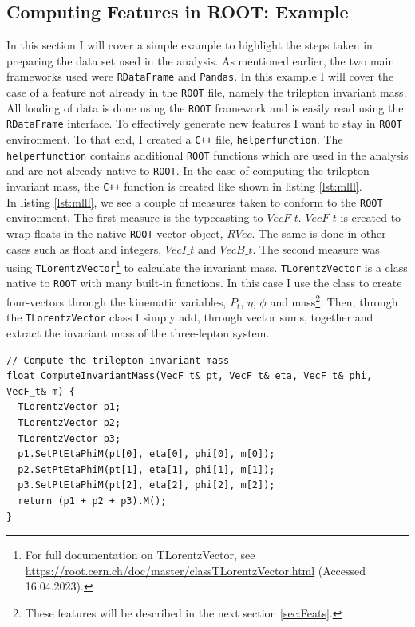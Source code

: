 \subsection{Computing Features in ROOT: Example}
In this section I will cover a simple example to highlight the steps taken in preparing the data set 
used in the analysis. As mentioned earlier, the two main frameworks used were \verb!RDataFrame! and \verb!Pandas!. 
In this example I will cover the case of a feature not already in the \verb!ROOT! file, namely the trilepton
invariant mass. All loading of data is done using the \verb!ROOT! framework and is easily read using the
\verb!RDataFrame! interface. To effectively generate new features I want to stay in \verb!ROOT! environment. To that end,
I created a \verb!C++! file, \texttt{helperfunction}. The \texttt{helperfunction} contains additional 
\verb!ROOT! functions which are used in the analysis and are not already native to \verb!ROOT!. In the case 
of computing the trilepton invariant mass, the \verb!C++! function is created like shown in listing 
\ref{lst:mlll}.
\\
In listing \ref{lst:mlll}, we see a couple of measures taken to conform to the \verb!ROOT! environment. The first measure is 
the typecasting to $VecF\_t$. $VecF\_t$ is created to wrap floats in the native \verb!ROOT! vector object, $RVec$. 
The same is done in other cases such as float and integers, $VecI\_t$ and $VecB\_t$. The second measure
was using \verb!TLorentzVector!\footnote{For full documentation on TLorentzVector, see \url{https://root.cern.ch/doc/master/classTLorentzVector.html} (Accessed 16.04.2023).} 
to calculate the invariant mass. \verb!TLorentzVector! is a class native to \verb!ROOT! with many built-in functions. In 
this case I use the class to create four-vectors through the kinematic variables, $P_t$, $\eta$, $\phi$ and mass\footnote{These features
will be described in the next section \ref{sec:Feats}.}. Then, through the \verb!TLorentzVector! class I simply add, through vector sums, 
together and extract the invariant mass of the three-lepton system. 
\lstset{style=Cpp}
\begin{lstlisting}[caption={$C{++}$-function which implementes the calculation of the trilepton invariant mass.},captionpos=b, label={lst:mlll}]
// Compute the trilepton invariant mass 
float ComputeInvariantMass(VecF_t& pt, VecF_t& eta, VecF_t& phi, VecF_t& m) {
  TLorentzVector p1;
  TLorentzVector p2;
  TLorentzVector p3;
  p1.SetPtEtaPhiM(pt[0], eta[0], phi[0], m[0]);
  p2.SetPtEtaPhiM(pt[1], eta[1], phi[1], m[1]);
  p3.SetPtEtaPhiM(pt[2], eta[2], phi[2], m[2]);
  return (p1 + p2 + p3).M();
}
\end{lstlisting}
